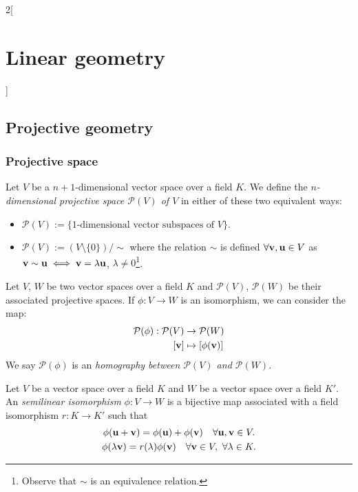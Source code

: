 \documentclass[../../../main.tex]{subfiles}
\begin{document}
\begin{multicols}{2}[\section{Linear geometry}]
    \subsection{Projective geometry}
    \subsubsection{Projective space}
    \begin{definition}
        Let $V$ be a $n+1$-dimensional vector space over a field $K$. We define the \textit{$n$-dimensional projective space $\mathcal{P}(V)$ of $V$} in either of these two equivalent ways:
        \begin{itemize}
            \item $\displaystyle\mathcal{P}(V):=\{\text{1-dimensional vector subspaces of $V$}\}$.
            \item $\displaystyle\mathcal{P}(V):=(V\setminus\{0\})/\sim$ where the relation $\sim$ is defined $\forall\boldsymbol{\mathrm{v}},\boldsymbol{\mathrm{u}}\in V$ as $\boldsymbol{\mathrm{v}}\sim \boldsymbol{\mathrm{u}}\iff \boldsymbol{\mathrm{v}}=\lambda \boldsymbol{\mathrm{u}}$, $\lambda\ne 0$\footnote{Observe that $\sim$ is an equivalence relation.}.
        \end{itemize}
    \end{definition}
    \begin{definition}
        Let $V$, $W$ be two vector spaces over a field $K$ and $\mathcal{P}(V)$, $\mathcal{P}(W)$ be their associated projective spaces. If $\phi:V\rightarrow W$ is an isomorphism, we can consider the map:
        \begin{align*}
            \mathcal{P}(\phi):\mathcal{P}(V) & \rightarrow\mathcal{P}(W) \\
            [\vf{v}]                         & \mapsto [\phi(\vf{v})]
        \end{align*}
        We say $\mathcal{P}(\phi)$ is an \textit{homography between $\mathcal{P}(V)$ and $\mathcal{P}(W)$}.
    \end{definition}
    \begin{definition}
        Let $V$ be a vector space over a field $K$ and $W$ be a vector space over a field $K'$. An \textit{semilinear isomorphism} $\phi:V\rightarrow W$ is a bijective map associated with a field isomorphism $r:K\rightarrow K'$ such that
        \begin{gather*}
            \phi(\vf{u}+\vf{v})=\phi(\vf{u})+\phi(\vf{v})\quad \forall \vf{u},\vf{v}\in V.\\
            \phi(\lambda \vf{v})=r(\lambda)\phi(\vf{v})\quad \forall \vf{v}\in V,\ \forall\lambda\in K.

\end{gather*}
\end{definition}
\end{multicols}
\end{document}
